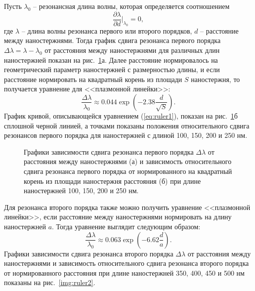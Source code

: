 Пусть $ \lambda_0 $ -- резонансная длина волны, которая определяется соотношением
\begin{equation}
\dfrac{\partial \lambda}{\partial d} \Big|_{\lambda _0} = 0,
\end{equation}
где $ \lambda $ -- длина волны резонанса первого или второго порядков, $ d $ -- расстояние между наностержнями. Тогда график сдвига резонанса первого порядка $ \Delta \lambda =  \lambda - \lambda_0 $ от расстояния между наностержнями для различных длин наностержней показан на рис.~\ref{img:ruler1}а. Далее расстояние нормировалось на геометрический параметр наностержней с размерностью длины, и если расстояние нормировать на квадратный корень из площади $ S $ наностержня, то получается уравнение для <<плазмонной линейки>>:
\begin{equation}
\frac{\Delta \lambda}{\lambda_0} \approx 0.044 \exp \left( - 2.38 \frac{d}{\sqrt{S}} \right).
\label{eq:ruler1}
\end{equation}
График кривой, описывающейся уравнением (\ref{eq:ruler1}), показан на рис.~\ref{img:ruler1}б сплошной черной линией, а точками показаны положения относительного сдвига резонансов первого порядка для наностержней с длиной 100, 150, 200 и 250 нм.

\begin{figure}
\caption{Графики зависимости сдвига резонанса первого порядка $ \Delta \lambda $ от расстояния между наностержнями (а) и зависимость относительного сдвига резонанса первого порядка от нормированного на квадратный корень из площади наностержня расстояния (б) при длине наностержней 100, 150, 200 и 250 нм. }
\label{img:ruler1}
\end{figure}

Для резонанса второго порядка также можно получить уравнение <<плазмонной линейки>>, если расстояние между наностержнями нормировать на длину наностержней $ a $. Тогда уравнение выглядит следующим образом:
\begin{equation}
\frac{\Delta \lambda}{\lambda_0} \approx 0.063 \exp \left( - 6.62 \frac{d}{a} \right).
\end{equation}
Графики зависимости сдвига резонанса второго порядка $ \Delta \lambda $ от расстояния между наностержнями и зависимость относительного сдвига резонанса второго порядка от нормированного расстояния при длине наностержней 350, 400, 450 и 500 нм показаны на рис.~\ref{img:ruler2}.

